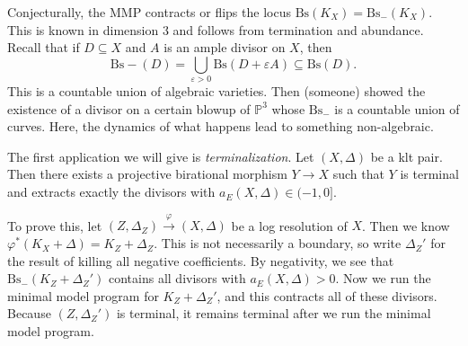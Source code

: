 \documentclass[leqno, openany]{memoir}
\theoremstyle{definition}
\theoremstyle{remark}
\theoremstyle{plain}
\theoremstyle{definition}
\theoremstyle{remark}
\renewcommand{\P}{\mathbb{P}}
\newcommand{\ep}{\varepsilon}
\newcommand{\mr}[1]{\mathrm{#1}}
\begin{document}
Conjecturally, the MMP contracts or flips the locus $\mr{Bs}(K_X) = \mr{Bs}_-(K_X)$. This is known in dimension $3$ and follows from termination and abundance. Recall that if $D \subseteq X$ and $A$ is an ample divisor on $X$, then 
\[ \mr{Bs}-(D) = \bigcup_{\ep > 0} \mr{Bs}(D + \ep A) \subseteq \mr{Bs}(D). \]
This is a countable union of algebraic varieties. Then (someone) showed the existence of a divisor on a certain blowup of $\P^3$ whose $\mr{Bs}_-$ is a countable union of curves. Here, the dynamics of what happens lead to something non-algebraic.

The first application we will give is \textit{terminalization}. Let $(X, \Delta)$ be a klt pair. Then there exists a projective birational morphism $Y \to X$ such that $Y$ is terminal and extracts exactly the divisors with $a_E(X, \Delta) \in (-1,0]$.

To prove this, let $(Z, \Delta_Z) \xrightarrow{\varphi} (X, \Delta)$ be a log resolution of $X$. Then we know $\varphi^*(K_X + \Delta) = K_Z + \Delta_Z$. This is not necessarily a boundary, so write $\Delta_Z'$ for the result of killing all negative coefficients. By negativity, we see that $\mr{Bs}_-(K_Z + \Delta_Z')$ contains all divisors with $a_E(X, \Delta) > 0$. Now we run the minimal model program for $K_Z + \Delta_Z'$, and this contracts all of these divisors. Because $(Z, \Delta_Z')$ is terminal, it remains terminal after we run the minimal model program.
\end{document}
